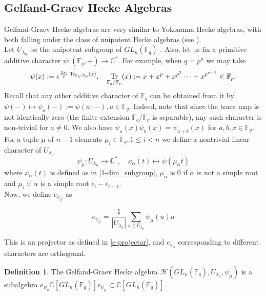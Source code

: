 \documentclass[12pt,reqno]{amsart}
\theoremstyle{definition}
\newtheorem{defn}[thm]{Definition}
\theoremstyle{remark}
\numberwithin{equation}{section}
\newcommand{\CC}{\mathbb{C}}
\newcommand{\GL}[1]{GL_{#1}(\mathbb{F}_q)}
\DeclareMathOperator{\tr}{Tr}
\def\IM#1{\textcolor[rgb]{0.00,0.00,0.75}{[I: #1]}}
\begin{document}
\subsection{Gelfand-Graev Hecke Algebras}

Gelfand-Graev Hecke algebras are very similar to Yokonuma-Hecke algebras, with both falling under the class of unipotent Hecke algebras (see \cite{T}).\\


Let $U_{\lambda_n}$ be the unipotent subgroup of $\GL{n}$%
. Also, let us fix a primitive additive character $\psi: (\mathbb{F}_q,+)\rightarrow \CC^*$. For example, when $q=p^n$ we may take
\[
\psi(x):=e^{\frac{2\pi {\rm i}}{p}\tr_{\mathbb{F}_q/\mathbb{F}_p}(x)} , \quad \tr_{\mathbb{F}_q/\mathbb{F}_p} (x):=x+x^p+x^{p^2}\dots+x^{p^{n-1}}\in \mathbb{F}_p.
\]
Recall that any other additive character of $\mathbb{F}_q$ can be obtained from it by $\psi(-)\mapsto \psi_{a}(-):=\psi(a\cdot -),a\in \mathbb{F}_q$. Indeed, note that since the trace map is not identically zero (the finite extension $\mathbb{F}_q/\mathbb{F}_p$ is separable), any such character is non-trivial for $a\neq 0$. We also have $\psi_a(x)\psi_b(x)=\psi_{a+b}(x)$ for $a,b,x\in \mathbb{F}_q$.\\

For a tuple $\mu$ of $n-1$ elements $\mu_{i}\in \mathbb{F}_q, 1\le i<n$ we define a nontrivial linear character of $U_{\lambda_n}$
\[\psi_{\mu}: U_{\lambda_n} \to \mathbb{C}^*, \quad x_{\alpha}(t)\mapsto \psi(\mu_{\alpha}t)\]
where $x_{\alpha}(t)$ is defined as in \eqref{1-dim_subgroup}, $\mu_{\alpha}$ is $0$ if $\alpha$ is not a simple root and $\mu_i$ if $\alpha$ is a simple root $\epsilon_i-\epsilon_{i+1}$.\\

Now, we define $e_{\psi_{\mu}}$ as

\[e_{\psi_{\mu}} = \frac{1}{|U_{\lambda_n}|}\sum_{u \in U_{\lambda_n}}\overline{\psi_{\mu}(u)}u\]

This is an projector as defined in \ref{e-projector}, and $e_{\psi_s}$ corresponding to different characters are orthogonal.

\begin{defn}
    The Gelfand-Graev Hecke algebra $\mathcal{H}(\GL{n}, U_{\lambda_n}, \psi_{\mu})$ is a subalgebra $e_{\psi_{\mu}} \mathbb{C}[\GL{n}] e_{\psi_{\mu}}\subset \CC[\GL{n}]$.    
\end{defn}
\end{document}
